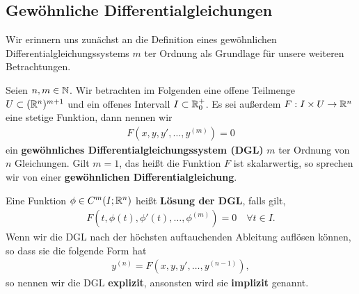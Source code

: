 \subsection{Gewöhnliche Differentialgleichungen}
\label{\detokenize{ode/repetition:gewohnliche-differentialgleichungen}}
Wir erinnern uns zunächst an die Definition eines gewöhnlichen Differentialgleichungssystems \(m\) ter Ordnung als Grundlage für unsere weiteren Betrachtungen.
\label{ode/repetition:def:DGL}
\begin{definition}{}{}



Seien \(n,m \in \mathbb{N}\).
Wir betrachten im Folgenden eine offene Teilmenge \(U\subset (\mathbb{R}^n)^{m+1}\) und ein offenes Intervall \(I\subset\mathbb{R}^+_0\).
Es sei außerdem \(F:I\times U\rightarrow\mathbb{R}^n\) eine stetige Funktion, dann nennen wir
\begin{align}\label{equation:ode/repetition:eq:DGL}
F(x,y,y',\ldots,y^{(m)}) = 0
\end{align}
ein \textbf{gewöhnliches Differentialgleichungssystem (DGL)} \(m\) ter Ordnung von \(n\) Gleichungen.
Gilt \(m=1\), das heißt die Funktion \(F\) ist skalarwertig, so sprechen wir von einer \textbf{gewöhnlichen Differentialgleichung}.

Eine Funktion \(\phi\in C^m(I;\mathbb{R}^n)\) heißt \textbf{Lösung der DGL}, falls gilt,
\begin{align*}
F(t, \phi(t), \phi'(t), \ldots, \phi^{(m)}) = 0 \quad \forall t\in I.
\end{align*}
Wenn wir die DGL nach der höchsten auftauchenden Ableitung auflösen können, so dass sie die folgende Form hat
\begin{align*}
y^{(n)} = F(x,y,y',\ldots,y^{(n-1)}),
\end{align*}
so nennen wir die DGL \textbf{explizit}, ansonsten wird sie \textbf{implizit} genannt.
\end{definition}


